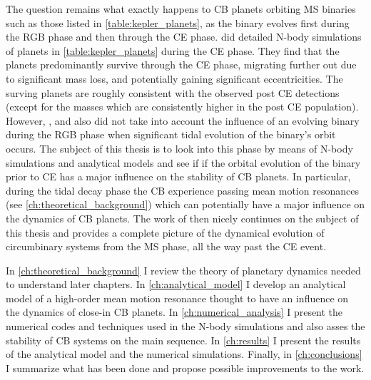 \documentclass[ twoside,openright,titlepage,numbers=noenddot,headinclude,%
                footinclude=true,cleardoublepage=empty,abstractoff, %
                BCOR=5mm,paper=a4,fontsize=11pt,%
                american,%
                ]{scrreprt}
\begin{document}
The question remains what exactly happens to CB planets orbiting MS binaries
such as those listed in \cref{table:kepler_planets}, as the binary 
evolves first during
the RGB phase and then through the CE phase. \cite{Kostov2016} did detailed
N-body simulations of  planets in \cref{table:kepler_planets} during the 
CE phase. They find that the planets predominantly survive through the
CE phase, migrating further out due to significant mass loss, and potentially
gaining significant eccentricities. The surving planets are roughly consistent
with the observed post CE detections (except for the masses which are 
consistently higher in the post CE population). However, \cite{Kostov2016},
and also \cite{Mustill2013a} did not take into account the influence of an 
evolving binary during the RGB phase when significant tidal evolution of
the binary's orbit occurs. The subject of this thesis is to look into
this phase by means of N-body simulations and analytical models and see if
if the orbital evolution of the binary prior to CE has a major influence on
the stability of CB planets. In particular, during the tidal decay phase the
CB experience passing mean motion resonances 
(see \cref{ch:theoretical_background}) which can potentially have a major 
influence on the dynamics of CB planets. The work of \cite{Kostov2016} then
nicely continues on the subject of this thesis and provides a complete picture
of the dynamical evolution of circumbinary systems from the MS phase, all
the way past the CE event. 

In \cref{ch:theoretical_background} I review the theory of planetary
dynamics needed to understand later chapters. In \cref{ch:analytical_model}
I develop an analytical model of a high-order mean motion 
resonance thought to have an influence on the dynamics of close-in CB planets.
In \cref{ch:numerical_analysis} I present the numerical codes and techniques
used in the N-body simulations and also asses the stability of CB systems on the
main sequence. In \cref{ch:results} I present the results of the analytical
model and the numerical simulations. Finally, in \cref{ch:conclusions}
I summarize what has been done and propose possible improvements to the work.

\clearpage
\end{document}
